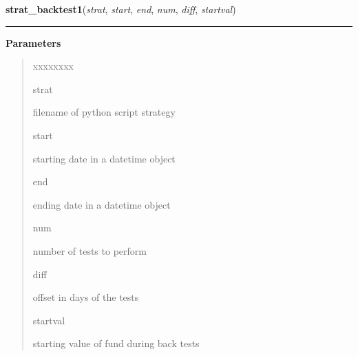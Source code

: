 \hspace{.8\funcindent}\begin{boxedminipage}{\funcwidth}

    \raggedright \textbf{strat\_backtest1}(\textit{strat}, \textit{start}, \textit{end}, \textit{num}, \textit{diff}, \textit{startval})

    \vspace{-1.5ex}

    \rule{\textwidth}{0.5\fboxrule}
\setlength{\parskip}{2ex}
\setlength{\parskip}{1ex}
      \textbf{Parameters}
      \vspace{-1ex}

      \begin{quote}
        \begin{Ventry}{xxxxxxxx}

          \item[strat]

          filename of python script strategy

          \item[start]

          starting date in a datetime object

          \item[end]

          ending date in a datetime object

          \item[num]

          number of tests to perform

          \item[diff]

          offset in days of the tests

          \item[startval]

          starting value of fund during back tests

        \end{Ventry}

      \end{quote}

    \end{boxedminipage}

    \label{QSTK:quicksim:quickSim:strat_backtest2}

    \vspace{0.5ex}

